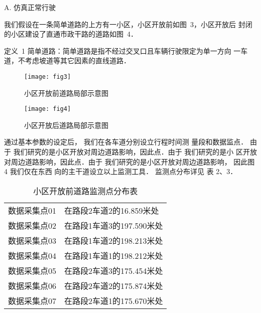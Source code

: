 A. 仿真正常行驶

我们假设在一条简单道路的上方有一小区，小区开放前如图~3，小区开放后
封闭的小区建设了直通市政干路的道路如图~4．

定义~1 简单道路：简单道路是指不经过交叉口且车辆行驶限定为单一方向
一车道，不考虑坡道等其它因素的直线道路．

\begin{figure}
  \centering
  \begin{minipage}{.5\linewidth}
   \centerline{\texttt{[image: fig3]}}
   \caption{小区开放前道路局部示意图}
  \end{minipage}\begin{minipage}{.5\linewidth}
   \centerline{\texttt{[image: fig4]}}
   \caption{小区开放后道路局部示意图}
  \end{minipage}
\end{figure}

通过基本参数的设定后， 我们在各车道分别设立行程时间测 量段和数据监点．
由于 我们研究的是小区开放对周边道路影响，因此点．由于 我们研究的是小
区开放对周边道路影响，因此点．由于 我们研究的是小区开放对周边道路影响，
因此图 4 我们仅在东西 向的主干道设立以上监测工具． 监测点分布详见 表 2、3．

\begin{table*}[h!]
  \centering
  \small
    \caption{小区开放前道路监测点分布表}
  \begin{tabular*}{0.8\linewidth}{p{150pt}<{\centering}|p{200pt}<{\raggedright}}
   \hline
数据采集点01& 在路段2车道2的16.859米处\\
数据采集点02& 在路段1车道3的197.590米处\\
数据采集点03& 在路段1车道2的198.213米处\\
数据采集点04& 在路段1车道1的198.212米处\\
数据采集点05& 在路段2车道3的175.454米处\\
数据采集点06& 在路段2车道2的175.874米处\\
数据采集点07& 在路段2车道1的175.670米处\\
\hline
  \end{tabular*}
  \label{tab2}
\end{table*}

